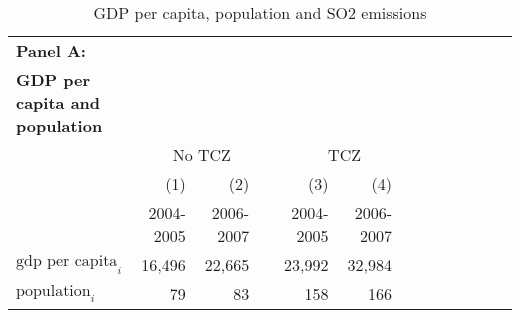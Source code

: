 \documentclass[12pt]{article}
\begin{document}
\begin{table}[!htb] \centering
    \caption{\\ GDP per capita, population and SO2 emissions}
      \begin{adjustbox}{width=\textwidth, totalheight=\baselineskip,keepaspectratio}
    \label{table_3}
    \begin{tabular}{lrrrrrrrrrrrr}
      \multicolumn{1}{l}{\textbf{\small Panel A:}} \\
      \multicolumn{1}{l}{\textbf{\small GDP per capita and population}} \\
      \toprule
     & \multicolumn{3}{c}{No TCZ} & \multicolumn{3}{c}{TCZ} \\
      & (1)  & (2) & & (3)  & (4) \\
      & 2004-2005 &  2006-2007 & & 2004-2005 &2006-2007  \\
      
      \midrule
      $\text{gdp per capita}_i$    & 16,496 & 22,665 & & 23,992 & 32,984 \\
$\text{population}_i$ &     79 &     83 &  &  158 &    166  \\


\end{tabular}
\end{adjustbox}
\end{table}
\end{document}
